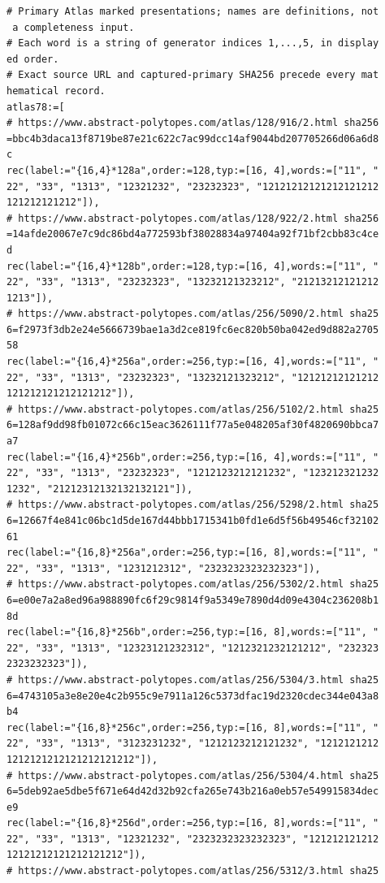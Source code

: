 \documentclass[
  11pt,
  a4paper,
]{article}
\begin{document}
\begin{verbatim}
# Primary Atlas marked presentations; names are definitions, not
 a completeness input.
# Each word is a string of generator indices 1,...,5, in display
ed order.
# Exact source URL and captured-primary SHA256 precede every mat
hematical record.
atlas78:=[
# https://www.abstract-polytopes.com/atlas/128/916/2.html sha256
=bbc4b3daca13f8719be87e21c622c7ac99dcc14af9044bd207705266d06a6d8
c
rec(label:="{16,4}*128a",order:=128,typ:=[16, 4],words:=["11", "
22", "33", "1313", "12321232", "23232323", "12121212121212121212
121212121212"]),
# https://www.abstract-polytopes.com/atlas/128/922/2.html sha256
=14afde20067e7c9dc86bd4a772593bf38028834a97404a92f71bf2cbb83c4ce
d
rec(label:="{16,4}*128b",order:=128,typ:=[16, 4],words:=["11", "
22", "33", "1313", "23232323", "13232121323212", "21213212121212
1213"]),
# https://www.abstract-polytopes.com/atlas/256/5090/2.html sha25
6=f2973f3db2e24e5666739bae1a3d2ce819fc6ec820b50ba042ed9d882a2705
58
rec(label:="{16,4}*256a",order:=256,typ:=[16, 4],words:=["11", "
22", "33", "1313", "23232323", "13232121323212", "12121212121212
121212121212121212"]),
# https://www.abstract-polytopes.com/atlas/256/5102/2.html sha25
6=128af9dd98fb01072c66c15eac3626111f77a5e048205af30f4820690bbca7
a7
rec(label:="{16,4}*256b",order:=256,typ:=[16, 4],words:=["11", "
22", "33", "1313", "23232323", "1212123212121232", "123212321232
1232", "21212312132132132121"]),
# https://www.abstract-polytopes.com/atlas/256/5298/2.html sha25
6=12667f4e841c06bc1d5de167d44bbb1715341b0fd1e6d5f56b49546cf32102
61
rec(label:="{16,8}*256a",order:=256,typ:=[16, 8],words:=["11", "
22", "33", "1313", "1231212312", "2323232323232323"]),
# https://www.abstract-polytopes.com/atlas/256/5302/2.html sha25
6=e00e7a2a8ed96a988890fc6f29c9814f9a5349e7890d4d09e4304c236208b1
8d
rec(label:="{16,8}*256b",order:=256,typ:=[16, 8],words:=["11", "
22", "33", "1313", "12323121232312", "1212321232121212", "232323
2323232323"]),
# https://www.abstract-polytopes.com/atlas/256/5304/3.html sha25
6=4743105a3e8e20e4c2b955c9e7911a126c5373dfac19d2320cdec344e043a8
b4
rec(label:="{16,8}*256c",order:=256,typ:=[16, 8],words:=["11", "
22", "33", "1313", "3123231232", "1212123212121232", "1212121212
1212121212121212121212"]),
# https://www.abstract-polytopes.com/atlas/256/5304/4.html sha25
6=5deb92ae5dbe5f671e64d42d32b92cfa265e743b216a0eb57e549915834dec
e9
rec(label:="{16,8}*256d",order:=256,typ:=[16, 8],words:=["11", "
22", "33", "1313", "12321232", "2323232323232323", "121212121212
12121212121212121212"]),
# https://www.abstract-polytopes.com/atlas/256/5312/3.html sha25

\end{verbatim}
\end{document}
